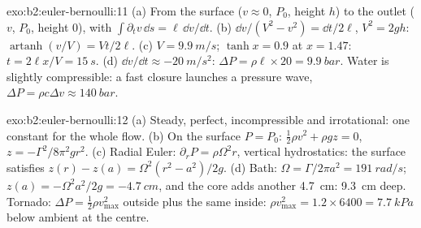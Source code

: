 \begin{solution}{exo:b2:euler-bernoulli:11}
(a) From the surface ($v \approx 0$, $P_0$, height $h$) to the outlet ($v$, $P_0$,
height $0$), with $\int\partial_tv\,\dd s = \ell\,\dd v/\dd t$. (b) $\dd v/(V^2 -
v^2) = \dd t/2\ell$, $V^2 = 2gh$: $\operatorname{artanh}(v/V) = Vt/2\ell$. (c) $V =
\qty{9.9}{m/s}$; $\tanh x = 0.9$ at $x = 1.47$: $t = 2\ell x/V = \qty{15}{s}$. (d)
$\dd v/\dd t \approx \qty{-20}{m/s^2}$: $\Delta P = \rho\ell \times 20 = \qty{9.9}{bar}$.
Water is slightly compressible: a fast closure launches a pressure
wave, $\Delta P = \rho c\Delta v \approx \qty{140}{bar}$.
\end{solution}

\begin{solution}{exo:b2:euler-bernoulli:12}
(a) Steady, perfect, incompressible and irrotational: one constant
for the whole flow. (b) On the surface $P = P_0$: $\tfrac12\rho v^2 + \rho gz =
0$, $z = -\Gamma^2/8\pi^2gr^2$. (c) Radial Euler: $\partial_rP = \rho\Omega^2r$,
vertical hydrostatics: the surface satisfies $z(r) - z(a) = \Omega^2(r^2 -
a^2)/2g$. (d) Bath: $\Omega = \Gamma/2\pi a^2 = \qty{191}{rad/s}$; $z(a) = -\Omega^2a^2/
2g = \qty{-4.7}{cm}$, and the core adds another \qty{4.7}{cm}: \qty{9.3}{cm} deep.
Tornado: $\Delta P = \tfrac12\rho v_{\max}^2$ outside plus the same inside:
$\rho v_{\max}^2 = 1.2 \times 6400 = \qty{7.7}{kPa}$ below ambient at the centre.
\end{solution}

